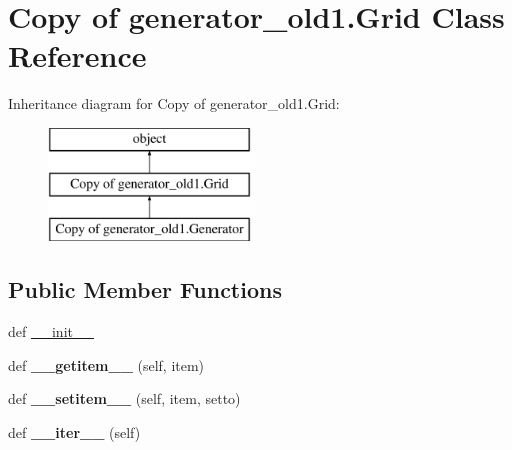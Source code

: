 \hypertarget{class_copy_01of_01generator__old1_1_1_grid}{}\section{Copy of generator\+\_\+old1.\+Grid Class Reference}
\label{class_copy_01of_01generator__old1_1_1_grid}
Inheritance diagram for Copy of generator\+\_\+old1.\+Grid\+:\begin{figure}[H]
\begin{center}
\leavevmode
\includegraphics[height=3.000000cm]{class_copy_01of_01generator__old1_1_1_grid}
\end{center}
\end{figure}
\subsection*{Public Member Functions}
\begin{DoxyCompactItemize}
\item 
def \hyperlink{class_copy_01of_01generator__old1_1_1_grid_a7aefdf5f8a4f6af472040354cf64ea64}{\+\_\+\+\_\+init\+\_\+\+\_\+}
\item 
\hypertarget{class_copy_01of_01generator__old1_1_1_grid_a89447cb83341053a644e3bfb245c0b69}{}def {\bfseries \+\_\+\+\_\+getitem\+\_\+\+\_\+} (self, item)\label{class_copy_01of_01generator__old1_1_1_grid_a89447cb83341053a644e3bfb245c0b69}

\item 
\hypertarget{class_copy_01of_01generator__old1_1_1_grid_a0b28e528e42ce5e3d7ee17c318f76c42}{}def {\bfseries \+\_\+\+\_\+setitem\+\_\+\+\_\+} (self, item, setto)\label{class_copy_01of_01generator__old1_1_1_grid_a0b28e528e42ce5e3d7ee17c318f76c42}

\item 
\hypertarget{class_copy_01of_01generator__old1_1_1_grid_a63e4ad654f1ee8d9484ae2750a2463a3}{}def {\bfseries \+\_\+\+\_\+iter\+\_\+\+\_\+} (self)\label{class_copy_01of_01generator__old1_1_1_grid_a63e4ad654f1ee8d9484ae2750a2463a3}

\end{DoxyCompactItemize}
